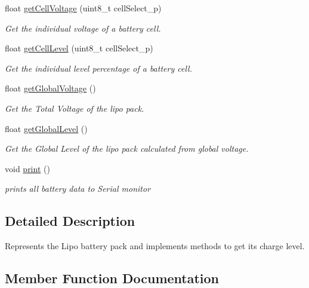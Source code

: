 \begin{DoxyCompactItemize}
float \hyperlink{class_battery_ae449209593f825ca7cefc958d51ba232}{get\+Cell\+Voltage} (uint8\+\_\+t cell\+Select\+\_\+p)
\begin{DoxyCompactList}\small\item\em Get the individual voltage of a battery cell. \end{DoxyCompactList}\item 
float \hyperlink{class_battery_a810c22577141039b044fdf59a9f9bdef}{get\+Cell\+Level} (uint8\+\_\+t cell\+Select\+\_\+p)
\begin{DoxyCompactList}\small\item\em Get the individual level percentage of a battery cell. \end{DoxyCompactList}\item 
float \hyperlink{class_battery_a288d5d3b5ebbe964751a9d64519aacdb}{get\+Global\+Voltage} ()
\begin{DoxyCompactList}\small\item\em Get the Total Voltage of the lipo pack. \end{DoxyCompactList}\item 
float \hyperlink{class_battery_a16e5bfb8a07ce93c08382fbcfb0b19be}{get\+Global\+Level} ()
\begin{DoxyCompactList}\small\item\em Get the Global Level of the lipo pack calculated from global voltage. \end{DoxyCompactList}\item 
void \hyperlink{class_battery_a66ad0266d08fe7d72c90d54654dffcea}{print} ()
\begin{DoxyCompactList}\small\item\em prints all battery data to Serial monitor \end{DoxyCompactList}\end{DoxyCompactItemize}


\subsection{Detailed Description}
Represents the Lipo battery pack and implements methods to get its charge level. 

\subsection{Member Function Documentation}
\mbox{\label{class_battery_a810c22577141039b044fdf59a9f9bdef}} 
